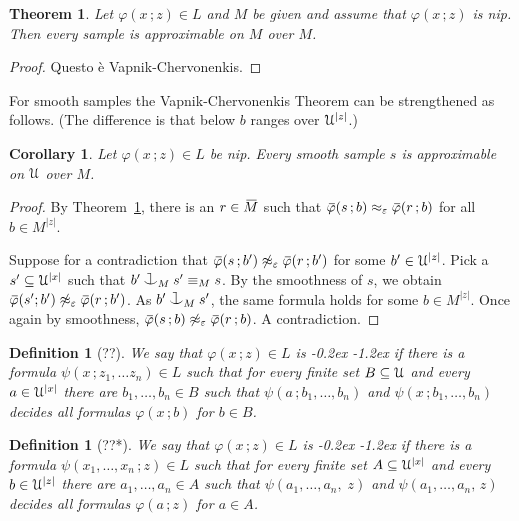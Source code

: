 \documentclass[10pt,openany]{article}
\newcommand{\sbar}[1]{\mkern 3mu\overline{\mkern-3mu#1\mkern-1mu}\mkern 1mu}
\newcommand{\barM}{\mkern 4mu\overline{\mkern-4mu M\mkern-2mu}\mkern 2mu}
\def\cnonfork{\mathbin{\raise1.8ex\rlap{\kern0.6ex\rule{0.6ex}{0.1ex}}
\rlap{\kern1.1ex\rule{0.1ex}{1.9ex}}\raise-0.3ex\hbox{$\smile$} } }
\def\U{\EuScript U}
\def\phi{\varphi}
\def\epsilon{\varepsilon}
\newcounter{thm}[section]
\theoremstyle{mio}
\newtheorem{theorem}[thm]{Theorem}
\newtheorem{corollary}[thm]{Corollary}
\newtheorem{definition}[thm]{Definition}
\theoremstyle{liscio}
\def\QED{\noindent\nolinebreak[4]\hspace{\stretch{1}}\rlap{\ \ $\Box$}\medskip}
\renewcommand*{\emph}[1]{%
   \kern-0.2ex 
   \smash{\tikz[baseline]
   \node[ rectangle, fill=emphcolor, rounded corners, 
          inner xsep=.3ex, inner ysep=.2ex, anchor=base,
          minimum height = 3ex
         ]{#1};
   }
   \kern-1.2ex 
}
\begin{document}
\begin{theorem}\label{thm_VC}
  Let $\phi(x\,;z)\in L$ and $M$ be given and assume that $\phi(x\,;z)$ is nip.
  Then every sample is approximable on $M$ over $M$.
\end{theorem}

\begin{proof}
  Questo è Vapnik-Chervonenkis.
\end{proof}

For smooth samples the Vapnik-Chervonenkis Theorem can be strengthened as follows. (The difference is that below $b$ ranges over $\U^{|z|}$.)

\begin{corollary}
  Let  $\phi(x\,;z)\in L$ be nip.
  Every smooth sample $s$ is approximable on $\U$ over $M$.
\end{corollary}

\begin{proof}
  By Theorem~\ref{thm_VC}, there is an $r\in \barM$ such that $\sbar\phi(s\,;b)\approx_\epsilon\sbar\phi(r\,;b)$ for all $b\in M^{|z|}$.

  Suppose for a contradiction that $\sbar\phi(s\,;b')\not\approx_\epsilon\sbar\phi(r\,;b')$ for some $b'\in\U^{|z|}$.
  Pick a  $s'\subseteq\U^{|x|}$ such that $b'\cnonfork_{M}s'\equiv_Ms$.
  By the smoothness of $s$, we obtain $\sbar\phi(s';b')\not\approx_\epsilon\sbar\phi(r\,;b')$.
  As $b'\cnonfork_{M}s'$, the same formula holds for some $b\in M^{|z|}$.
  Once again by smoothness, $\sbar\phi(s\,;b)\not\approx_\epsilon\sbar\phi(r\,;b)$.
  A contradiction.
\end{proof}

\begin{definition}[??]
  We say that $\phi(x\,;z)\in L$ is \emph{distal\/} if there is a formula $\psi(x\,;z_1,\dots z_n)\in L$ such that for every finite set $B\subseteq\U$ and every $a\in\U^{|x|}$ there are $b_1,\dots,b_n\in B$ such that $\psi(a\,;b_1,\dots,b_n)$ and $\psi(x\,;b_1,\dots,b_n)$ decides all formulas $\phi(x\,; b)$ for $b\in B$.\QED
\end{definition}

\begin{definition}[??*]
  We say that $\phi(x\,;z)\in L$ is \emph{distal\/} if there is a formula $\psi(x_1,\dots,x_n\,;z)\in L$ such that for every finite set $A\subseteq\U^{|x|}$ and every $b\in\U^{|z|}$ there are $a_1,\dots,a_n\in A$ such that $\psi(a_1,\dots,a_n,\;z)$ and $\psi(a_1,\dots,a_n,\,z)$ decides all formulas $\phi(a\,; z)$ for $a\in A$.\QED
\end{definition}
\end{document}
